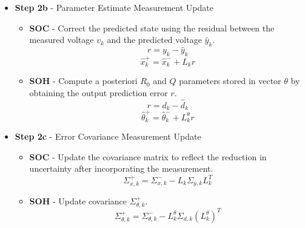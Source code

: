 \begin{itemize}
\begin{itemize}
            \item[\(\circ\)] \textbf{\acs{SOH}} - Update $\hat{C}_{k-1}^\theta$ and $\hat{D}_{k-1}^\theta$ by deriving using chain rule
            as shown in Section~\ref{SOHEKF} and obtain covariance and Kalman filter gain.
            \begin{equation}
                \Sigma_{d,k} =  \hat{C}_k^\theta \Sigma_{\theta,k}^- (\hat{C}_k^\theta)^T + \hat{D}_k^\theta \Sigma_e (\hat{D}_k)^T
            \end{equation}
            \begin{equation}
                L_k^\theta = \Sigma_{\theta,k}^- (\hat{C}_k^\theta)^T (\Sigma_{d,k})^{-1}
            \end{equation}
        \end{itemize}
    \item \textbf{Step 2b} - Parameter Estimate Measurement Update
        \begin{itemize}
            \item[\(\circ\)] \textbf{\acs{SOC}} - Correct the predicted state using the residual between the measured voltage $v_k$ and the predicted voltage $\hat{y}_k$.
            \begin{equation}
                r = y_k - \hat{y}_k
            \end{equation}
            \begin{equation}
                \hat{x}_k^+ = \hat{x}_k^- + L_k r
            \end{equation}
            \item[\(\circ\)] \textbf{\acs{SOH}} - Compute a posteriori $R_0$ and $Q$ parameters stored in vector $\theta$ by obtaining the output prediction error $r$.
            \begin{equation}
                r = d_k - \hat{d}_k
            \end{equation}
            \begin{equation}
                \hat{\theta}_k^+ = \hat{\theta}_k^- + L_k^\theta r
            \end{equation}
        \end{itemize}
    \item \textbf{Step 2c} - Error Covariance Measurement Update
        \begin{itemize}
            \item[\(\circ\)] \textbf{\acs{SOC}} - Update the covariance matrix to reflect the reduction in uncertainty after incorporating the measurement.
                \begin{equation}
                    \Sigma_{x,k}^+ = \Sigma_{x,k}^- - L_k \Sigma_{y,k} L_k^T
                \end{equation}
                \item[\(\circ\)] \textbf{\acs{SOH}} - Update covariance $\Sigma_{\theta,k}^+$.
                \begin{equation}
                    \Sigma_{\theta,k}^+ = \Sigma_{\theta,k}^- - L_k^\theta \Sigma_{d,k} (L_k^\theta)^T
                \end{equation}
        \end{itemize}
\end{itemize}

